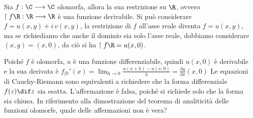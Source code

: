     Sia $f : \C \longrightarrow \C$ olomorfa, allora la sua restrizione su $\R$, ovvero $\restriction{f}{\R} : \R \longrightarrow \R$ è una funzione derivabile.
    Si può considerare $f = u(x,y) + i\, v(x,y)$, la restrizione di $f$ all'asse reale diventa $f = u(x,y)$, ma se richiediamo che anche il dominio sia solo l'asse reale, dobbiamo considerare $(x,y) = (x,0)$, da ciò si ha
    $\restriction{f}{\R} = u(x,0)$. 
    
    Poiché $f$ è olomorfa, $u$ è una funzione differenziabile, quindi $u(x,0)$ è derivabile e la sua derivata è 
    $f_{| \mathbb{R}}'(x) = \lim_{h \to 0} \frac{u(x+h) - u(x,0)}{h} = \frac{\partial u}{\partial x}(x,0)$
Le equazioni di Cauchy-Riemann sono equivalenti a richiedere che la forma differenziale $f(z) \dif z$ sia esatta.
    L'affermazione è falsa, poiché si richiede solo che la forma sia chiusa.
    In riferimento alla dimostrazione del teorema di analiticità delle funzioni olomorfe, quale delle affermazioni non è vera?

